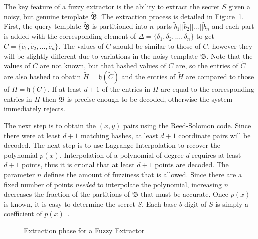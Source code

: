 \documentclass[11pt]{article}
\begin{document}
The key feature of a fuzzy extractor is the ability to extract the secret $S$ given a noisy, but genuine template $\tilde{\mathfrak B}$. The extraction process is detailed in Figure~\ref{fig:extract}. First, the query template $\tilde{\mathfrak B}$ is partitioned into $n$ parts $\tilde b_1||\tilde b_2||\ldots||\tilde b_n$ and each part is added with the corresponding element of $\Delta = \{\delta_1, \delta_2,\ldots,\delta_n\}$ to get $\tilde C = \{\tilde c_1, \tilde c_2, \ldots, \tilde c_n\}$. The values of $\tilde C$ should be similar to those of $C$, however they will be slightly different due to variations in the noisy template $\mathfrak B$. Note that the values of $C$ are not known, but that hashed values of $C$ are, so the entries of $\tilde C$ are also hashed to obatin $\tilde H = \mathfrak h(\tilde C)$ and the entries of $\tilde H$ are compared to those of $H = \mathfrak h(C)$. If at least $d+1$ of the entries in $H$ are equal to the corresponding entries in $\tilde H$ then $\tilde{\mathfrak B}$ is precise enough to be decoded, otherwise the system immediately rejects.

The next step is to obtain the $(x, y)$ pairs using the Reed-Solomon code. Since there were at least $d+1$ matching hashes, at least $d+1$ coordinate pairs will be decoded. The next step is to use Lagrange Interpolation to recover the polynomial $p(x)$. Interpolation of a polynomial of degree $d$ requires at least $d+1$ points, thus it is crucial that at least $d+1$ points are decoded. The parameter $n$ defines the amount of fuzziness that is allowed. Since there are a fixed number of points \textit{needed} to interpolate the polynomial, increasing $n$ decreases the fraction of the partitions of $\mathfrak B$ that must be accurate. Once $p(x)$ is known, it is easy to determine the secret $S$. Each base $b$ digit of $S$ is simply a coefficient of $p(x)$~\cite{conf/csreaSAM/AlvarezEA09}.

\begin{figure}[h!]
\centering
{}
\caption{Extraction phase for a Fuzzy Extractor}
\label{fig:extract}
\end{figure}
\end{document}
